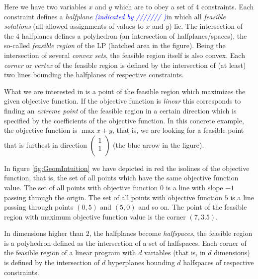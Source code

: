 \documentclass{article}
\begin{document}
Here we have two  variables $x$ and $y$ which are to obey a set of $4$ constraints. 
Each constraint defines a \emph{halfplane} \textcolor{blue}{\emph{(indicated by /////// )}}in which all \emph{feasible solutions}
(all allowed assignments of values to $x$ and $y$) lie. The intersection of the
$4$ halfplanes defines a polyhedron (an intersection of halfplanes/spaces),
the so-called \emph{feasible region} of the LP (hatched area in the figure). 
Being the intersection of several
\emph{convex sets}, the feasible region itself is also convex. Each \emph{corner} or \emph{vertex} of the feasible region is defined by the intersection of (at least) two lines bounding the halfplanes of respective constraints.

What we are interested in is a point of the feasible region which maximizes the given objective
function. If the objective function is \emph{linear} this corresponds to finding an \emph{extreme
point} of the feasible region in a certain direction which is specified by the coefficients
of the objective function. In this concrete example, the objective function is $\max x+y$, that
is, we are looking for a feasible point that is furthest in direction 
$\left( \begin{array}{c} 
1\\ 
1\\ 
\end{array}
\right)$ (the blue arrow in the figure). 

In figure \ref{fig:GeomIntuition} we have depicted in red the isolines of the objective function, that is, the
set of all points which have the same objective function value. The set of all points with objective function $0$ is
a line with slope $-1$ passing through the origin. The set of all points with objective function $5$ is a 
line passing through points $(0,5)$ and $(5,0)$ and so on. The point of the feasible region
with maximum objective function value is the corner $(7, 3.5)$.

In dimensions higher than $2$, the halfplanes become \emph{halfspaces}, the feasible region is a polyhedron defined as the intersection of a set of halfspaces. Each corner of the feasible region of a linear program with $d$ variables (that is, in $d$ dimensions) is defined by the intersection of $d$ hyperplanes bounding $d$ halfspaces of respective constraints.
\end{document}
